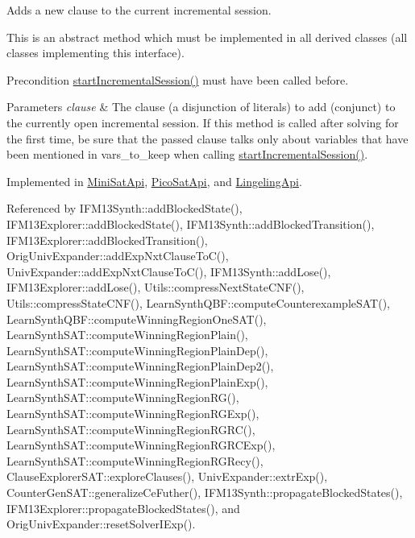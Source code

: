 Adds a new clause to the current incremental session. 

This is an abstract method which must be implemented in all derived classes (all classes implementing this interface).

\begin{DoxyPrecond}{Precondition}
\hyperlink{classSatSolver_a74603f84c3f2383a5fc44d5a8093cbea}{start\-Incremental\-Session()} must have been called before. 
\end{DoxyPrecond}

\begin{DoxyParams}{Parameters}
{\em clause} & The clause (a disjunction of literals) to add (conjunct) to the currently open incremental session. If this method is called after solving for the first time, be sure that the passed clause talks only about variables that have been mentioned in vars\-\_\-to\-\_\-keep when calling \hyperlink{classSatSolver_a74603f84c3f2383a5fc44d5a8093cbea}{start\-Incremental\-Session()}. \\
\hline
\end{DoxyParams}


Implemented in \hyperlink{classMiniSatApi_af2115a84419b7480ff55b747f7ddd60a}{Mini\-Sat\-Api}, \hyperlink{classPicoSatApi_aaafa1c5c7f1058029127a39a32ceada6}{Pico\-Sat\-Api}, and \hyperlink{classLingelingApi_afb3e0d0ab541b89ef6c281145f53105f}{Lingeling\-Api}.



Referenced by I\-F\-M13\-Synth\-::add\-Blocked\-State(), I\-F\-M13\-Explorer\-::add\-Blocked\-State(), I\-F\-M13\-Synth\-::add\-Blocked\-Transition(), I\-F\-M13\-Explorer\-::add\-Blocked\-Transition(), Orig\-Univ\-Expander\-::add\-Exp\-Nxt\-Clause\-To\-C(), Univ\-Expander\-::add\-Exp\-Nxt\-Clause\-To\-C(), I\-F\-M13\-Synth\-::add\-Lose(), I\-F\-M13\-Explorer\-::add\-Lose(), Utils\-::compress\-Next\-State\-C\-N\-F(), Utils\-::compress\-State\-C\-N\-F(), Learn\-Synth\-Q\-B\-F\-::compute\-Counterexample\-S\-A\-T(), Learn\-Synth\-Q\-B\-F\-::compute\-Winning\-Region\-One\-S\-A\-T(), Learn\-Synth\-S\-A\-T\-::compute\-Winning\-Region\-Plain(), Learn\-Synth\-S\-A\-T\-::compute\-Winning\-Region\-Plain\-Dep(), Learn\-Synth\-S\-A\-T\-::compute\-Winning\-Region\-Plain\-Dep2(), Learn\-Synth\-S\-A\-T\-::compute\-Winning\-Region\-Plain\-Exp(), Learn\-Synth\-S\-A\-T\-::compute\-Winning\-Region\-R\-G(), Learn\-Synth\-S\-A\-T\-::compute\-Winning\-Region\-R\-G\-Exp(), Learn\-Synth\-S\-A\-T\-::compute\-Winning\-Region\-R\-G\-R\-C(), Learn\-Synth\-S\-A\-T\-::compute\-Winning\-Region\-R\-G\-R\-C\-Exp(), Learn\-Synth\-S\-A\-T\-::compute\-Winning\-Region\-R\-G\-Recy(), Clause\-Explorer\-S\-A\-T\-::explore\-Clauses(), Univ\-Expander\-::extr\-Exp(), Counter\-Gen\-S\-A\-T\-::generalize\-Ce\-Futher(), I\-F\-M13\-Synth\-::propagate\-Blocked\-States(), I\-F\-M13\-Explorer\-::propagate\-Blocked\-States(), and Orig\-Univ\-Expander\-::reset\-Solver\-I\-Exp().

